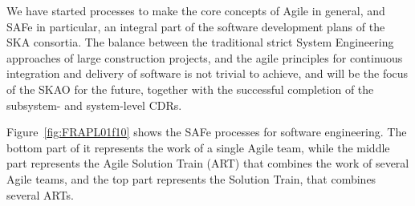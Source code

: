 \documentclass[a4paper,
               biblatex,       %
               keeplastbox,    %
               ]{jacow-2_1}    %
\begin{document}
We have started processes to make the core concepts of Agile in general, and SAFe in particular, an integral part of the software development plans of the SKA consortia. The balance between the traditional strict System Engineering approaches of large construction projects, and the agile principles for continuous integration and delivery of software is not trivial to achieve, and will be the focus of the SKAO for the future, together with the successful completion of the subsystem- and system-level CDRs.

Figure~\ref{fig:FRAPL01f10} shows the SAFe processes for software engineering. The bottom part of it represents the work of a single Agile team, while the middle part represents the Agile Solution Train (ART) that combines the work of several Agile teams, and the top part represents the Solution Train, that combines several ARTs.
\end{document}
